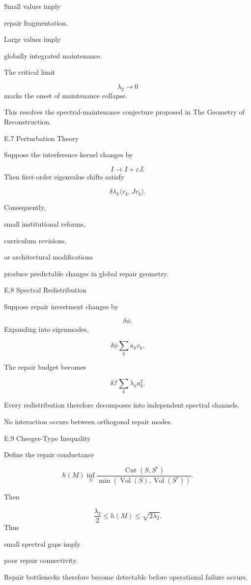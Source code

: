 \documentclass[12pt,oneside]{article}
\theoremstyle{plain}
\theoremstyle{definition}
\theoremstyle{remark}
\begin{document}
Small values imply

repair fragmentation.

Large values imply

globally integrated maintenance.

The critical limit

\[
\lambda_2
\rightarrow0
\]
marks the onset of maintenance collapse.

This resolves the spectral-maintenance conjecture proposed in The Geometry of Reconstruction.


E.7 Perturbation Theory

Suppose the interference kernel changes by

\[
I
\rightarrow
I+\varepsilon J.
\]
Then first-order eigenvalue shifts satisfy

\[
\delta\lambda_k
\langle
v_k,
Jv_k
\rangle.
\]

Consequently,

small institutional reforms,

curriculum revisions,

or architectural modifications

produce predictable changes in global repair geometry.


E.8 Spectral Redistribution

Suppose repair investment changes by

\[
\delta\phi.
\]
Expanding into eigenmodes,

\[
\delta\phi
\sum_k
a_kv_k.
\]

The repair budget becomes

\[
\delta\mathcal I
\sum_k
\lambda_ka_k^2.
\]

Every redistribution therefore decomposes into independent spectral channels.

No interaction occurs between orthogonal repair modes.


E.9 Cheeger-Type Inequality

Define the repair conductance

\[
h(M)
\inf_S
\frac{
\operatorname{Cut}(S,S^c)
}
{
\min
(
\operatorname{Vol}(S),
\operatorname{Vol}(S^c)
)
}.
\]

Then

\[
\frac{\lambda_2}{2}
\le
h(M)
\le
\sqrt{2\lambda_2}.
\]
Thus

small spectral gaps imply

poor repair connectivity.

Repair bottlenecks therefore become detectable before operational failure occurs.
\end{document}
